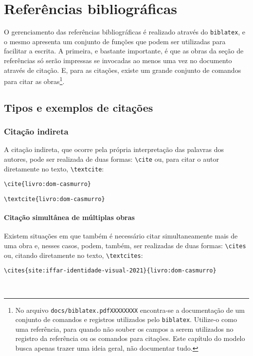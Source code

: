 \section{Referências bibliográficas}
O gerenciamento das referências bibliográficas é realizado através do \verb|biblatex|, e o mesmo apresenta um conjunto de funções que podem ser utilizadas para facilitar a escrita. A primeira, e bastante importante, é que as obras da seção de referências só serão impressas se invocadas ao menos uma vez no documento através de citação. E, para as citações, existe um grande conjunto de comandos para citar as obras\footnote{\label{nota:biblatex-cheatsheet}No arquivo \texttt{docs/biblatex.pdfXXXXXXXX} encontra-se a documentação de um conjunto de comandos e registros utilizados pelo \texttt{biblatex}. Utilize-o como uma referência, para quando não souber os campos a serem utilizados no registro da referência ou os comandos para citações. Este capítulo do modelo busca apenas trazer uma ideia geral, não documentar tudo.}.

\subsection{Tipos e exemplos de citações}
\subsubsection{Citação indireta}
A citação indireta, que ocorre pela própria interpretação das palavras dos autores, pode ser realizada de duas formas: \verb|\cite| ou, para citar o autor diretamente no texto, \verb|\textcite|:

\verb|\cite{livro:dom-casmurro}|

\cite{livro:dom-casmurro}

\verb|\textcite{livro:dom-casmurro}|

\textcite{livro:dom-casmurro}

\paragraph{Citação simultânea de múltiplas obras}
Existem situações em que também é necessário citar simultaneamente mais de uma obra e, nesses casos, podem, também, ser realizadas de duas formas: \verb|\cites| ou, citando diretamente no texto, \verb|\textcites|:

\verb|\cites{site:iffar-identidade-visual-2021}{livro:dom-casmurro}|

\cites{site:iffar-identidade-visual-2021}{livro:dom-casmurro}\\

